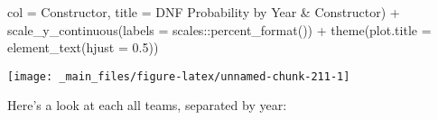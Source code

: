 \documentclass[
]{book}
\newenvironment{Shaded}{\begin{snugshade}}{\end{snugshade}}
\newcommand{\AttributeTok}[1]{\textcolor[rgb]{0.77,0.63,0.00}{#1}}
\newcommand{\FloatTok}[1]{\textcolor[rgb]{0.00,0.00,0.81}{#1}}
\newcommand{\FunctionTok}[1]{\textcolor[rgb]{0.00,0.00,0.00}{#1}}
\newcommand{\NormalTok}[1]{#1}
\newcommand{\SpecialCharTok}[1]{\textcolor[rgb]{0.00,0.00,0.00}{#1}}
\newcommand{\StringTok}[1]{\textcolor[rgb]{0.31,0.60,0.02}{#1}}
\begin{document}
\begin{Shaded}
\begin{Highlighting}[]
       \AttributeTok{col =} \StringTok{\textquotesingle{}Constructor\textquotesingle{}}\NormalTok{,}
       \AttributeTok{title =} \StringTok{\textquotesingle{}DNF Probability by Year \& Constructor\textquotesingle{}}\NormalTok{) }\SpecialCharTok{+}
\FunctionTok{scale\_y\_continuous}\NormalTok{(}\AttributeTok{labels =}\NormalTok{ scales}\SpecialCharTok{::}\FunctionTok{percent\_format}\NormalTok{()) }\SpecialCharTok{+}
  \FunctionTok{theme}\NormalTok{(}\AttributeTok{plot.title =} \FunctionTok{element\_text}\NormalTok{(}\AttributeTok{hjust =} \FloatTok{0.5}\NormalTok{))}
\end{Highlighting}
\end{Shaded}

\begin{center}\texttt{[image: \_main\_files/figure-latex/unnamed-chunk-211-1]} \end{center}

Here's a look at each all teams, separated by year:
\end{document}
